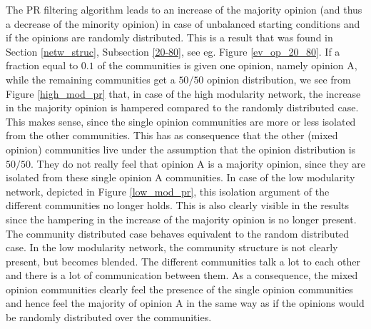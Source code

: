\documentclass[11 pt , letterpaper , twoside , openright]{book}
\begin{document}
The PR filtering algorithm leads to an increase of the majority opinion (and thus a decrease of the minority opinion) in case of unbalanced starting conditions and if the opinions are randomly distributed. This is a result that was found in Section \ref{netw_struc}, Subsection \ref{20-80}, see eg. Figure \ref{ev_op_20_80}. If a fraction equal to $0.1$ of the communities is given one opinion, namely opinion A, while the remaining communities get a $50/50$ opinion distribution, we see from Figure \ref{high_mod_pr} that, in case of the high modularity network, the increase in the majority opinion is hampered compared to the randomly distributed case. This makes sense, since the single opinion communities are more or less isolated from the other communities. This has as consequence that the other (mixed opinion) communities live under the assumption that the opinion distribution is $50/50$. They do not really feel that opinion A is a majority opinion, since they are isolated from these single opinion A communities. In case of the low modularity network, depicted in Figure \ref{low_mod_pr}, this isolation argument of the different communities no longer holds. This is also clearly visible in the results since the hampering in the increase of the majority opinion is no longer present. The community distributed case behaves equivalent to the random distributed case. In the low modularity network, the community structure is not clearly present, but becomes blended. The different communities talk a lot to each other and there is a lot of communication between them. As a consequence, the mixed opinion communities clearly feel the presence of the single opinion communities and hence feel the majority of opinion A in the same way as if the opinions would be randomly distributed over the communities. 
\end{document}
